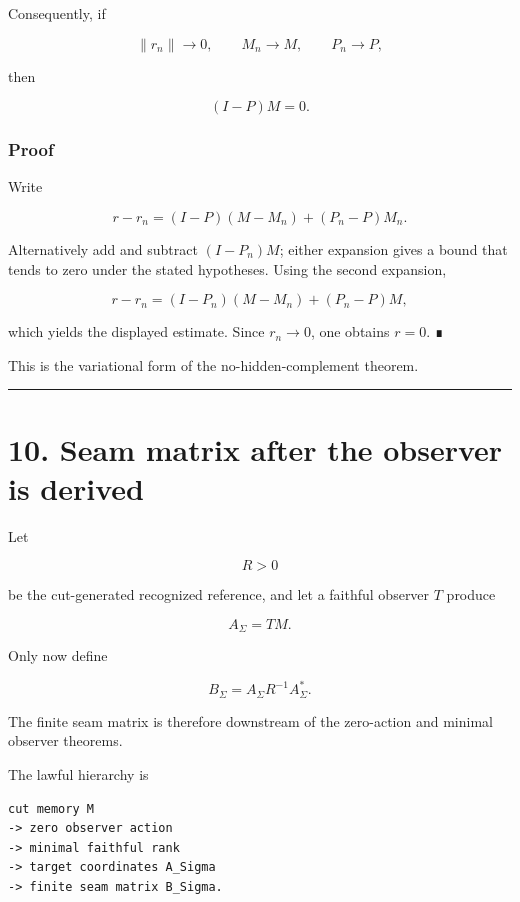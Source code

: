 Consequently, if

\[
\|r_n\|\to0,
\qquad
M_n\to M,
\qquad
P_n\to P,
\]

then

\[
\boxed{(I-P)M=0.}
\]

\hypertarget{proof-4}{%
\subsubsection{Proof}\label{proof-4}}

Write

\[
r-r_n
=(I-P)(M-M_n)+(P_n-P)M_n.
\]

Alternatively add and subtract \((I-P_n)M\); either expansion gives a bound
that tends to zero under the stated hypotheses. Using the second expansion,

\[
r-r_n
=(I-P_n)(M-M_n)+(P_n-P)M,
\]

which yields the displayed estimate. Since \(r_n\to0\), one obtains \(r=0\).
∎

This is the variational form of the no-hidden-complement theorem.

\begin{center}\rule{0.5\linewidth}{0.5pt}\end{center}

\hypertarget{seam-matrix-after-the-observer-is-derived}{%
\section{10. Seam matrix after the observer is derived}\label{seam-matrix-after-the-observer-is-derived}}

Let

\[
R>0
\]

be the cut-generated recognized reference, and let a faithful observer \(T\)
produce

\[
A_\Sigma=TM.
\]

Only now define

\[
\boxed{
B_\Sigma=A_\Sigma R^{-1}A_\Sigma^*.
}
\]

The finite seam matrix is therefore downstream of the zero-action and minimal
observer theorems.

The lawful hierarchy is

\begin{verbatim}
cut memory M
-> zero observer action
-> minimal faithful rank
-> target coordinates A_Sigma
-> finite seam matrix B_Sigma.
\end{verbatim}

